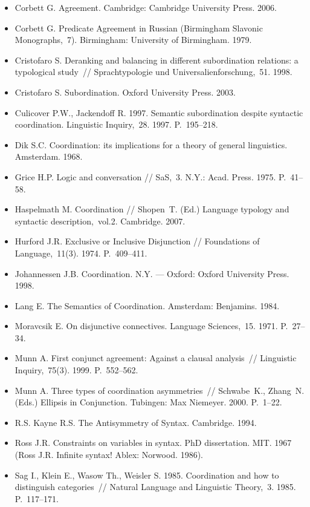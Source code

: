 \begin{itemize}
\item
  Corbett G. Agreement. Cambridge: Cambridge University Press. 2006.
\item
  Corbett G. Predicate Agreement in Russian (Birmingham Slavonic
  Monographs,~7). Birmingham: University of Birmingham. 1979.
\item
  Cristofaro S. Deranking and balancing in different subordination
  relations: a typological study~// Sprachtypologie und
  Universalienforschung,~51. 1998.
\item
  Cristofaro S. Subordination. Oxford University Press. 2003.
\item
  Culicover P.W., Jackendoff R. 1997. Semantic subordination despite
  syntactic coordination. Linguistic Inquiry,~28. 1997. P.~195--218.
\item
  Dik S.C. Coordination: its implications for a theory of general
  linguistics. Amsterdam. 1968.
\item
  Grice H.P. Logic and conversation // SaS,~3. N.Y.: Acad. Press. 1975.
  P.~41--58.
\item
  Haspelmath M. Coordination // Shopen~T. (Ed.) Language typology and
  syntactic description,~vol.2. Cambridge. 2007.
\item
  Hurford J.R. Exclusive or Inclusive Disjunction // Foundations of
  Language,~11(3). 1974. P.~409--411.
\item
  Johannessen J.B. Coordination. N.Y. --- Oxford: Oxford University
  Press. 1998.
\item
  Lang E. The Semantics of Coordination. Amsterdam: Benjamins. 1984.
\item
  Moravcsik E. On disjunctive connectives. Language Sciences,~15. 1971.
  P.~27--34.
\item
  Munn A. First conjunct agreement: Against a clausal analysis~//
  Linguistic Inquiry,~75(3). 1999. P.~552--562.
\item
  Munn A. Three types of coordination asymmetries~// Schwabe~K.,
  Zhang~N. (Eds.) Ellipsis in Conjunction. Tubingen: Max Niemeyer. 2000.
  P.~1--22.
\item
  R.S. Kayne R.S. The Antisymmetry of Syntax. Cambridge. 1994.
\item
  Ross J.R. Constraints on variables in syntax. PhD dissertation. MIT.
  1967 (Ross J.R. Infinite syntax! Ablex: Norwood. 1986).
\item
  Sag I., Klein E., Wasow Th., Weisler S. 1985. Coordination and how to
  distinguish categories~// Natural Language and Linguistic Theory,~3.
  1985. P.~117--171.

\end{itemize}
